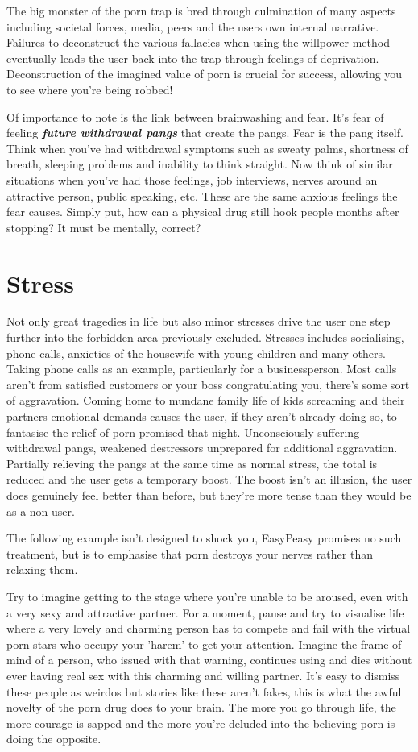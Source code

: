 \documentclass[easypeasy.tex]{subfiles}
\begin{document}
The big monster of the porn trap is bred through culmination of many aspects including societal forces, media, peers and the users own internal narrative. Failures to deconstruct the various fallacies when using the willpower method eventually leads the user back into the trap through feelings of deprivation. Deconstruction of the imagined value of porn is crucial for success, allowing you to see where you're being robbed!

Of importance to note is the link between brainwashing and fear. It's fear of feeling \textit{\textbf{future withdrawal pangs}} that create the pangs. Fear is the pang itself. Think when you've had withdrawal symptoms such as sweaty palms, shortness of breath, sleeping problems and inability to think straight. Now think of similar situations when you've had those feelings, job interviews, nerves around an attractive person, public speaking, etc. These are the same anxious feelings the fear causes. Simply put, how can a physical drug still hook people months after stopping? It must be mentally, correct?

\section{Stress}

Not only great tragedies in life but also minor stresses drive the user one step further into the forbidden area previously excluded. Stresses includes socialising, phone calls, anxieties of the housewife with young children and many others. Taking phone calls as an example, particularly for a businessperson. Most calls aren't from satisfied customers or your boss congratulating you, there's some sort of aggravation. Coming home to mundane family life of kids screaming and their partners emotional demands causes the user, if they aren't already doing so, to fantasise the relief of porn promised that night. Unconsciously suffering withdrawal pangs, weakened destressors unprepared for additional aggravation. Partially relieving the pangs at the same time as normal stress, the total is reduced and the user gets a temporary boost. The boost isn't an illusion, the user does genuinely feel better than before, but they're more tense than they would be as a non-user.

The following example isn't designed to shock you, EasyPeasy promises no such treatment, but is to emphasise that porn destroys your nerves rather than relaxing them.

Try to imagine getting to the stage where you're unable to be aroused, even with a very sexy and attractive partner. For a moment, pause and try to visualise life where a very lovely and charming person has to compete and fail with the virtual porn stars who occupy your 'harem' to get your attention. Imagine the frame of mind of a person, who issued with that warning, continues using and dies without ever having real sex with this charming and willing partner. It's easy to dismiss these people as weirdos but stories like these aren't fakes, this is what the awful novelty of the porn drug does to your brain. The more you go through life, the more courage is sapped and the more you're deluded into the believing porn is doing the opposite.
\end{document}
